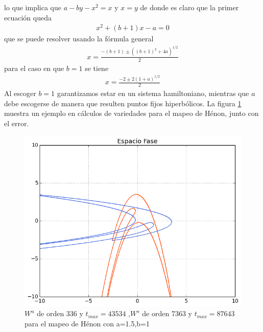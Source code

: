 lo que implica que $a-by-x^{2}=x$ y $x=y$ de donde es claro que la primer ecuación queda
\begin{eqnarray*}
x^{2}+(b+1)x-a=0
\end{eqnarray*}
que se puede resolver usando la fórmula general
\begin{eqnarray*}
x=\frac{-(b+1)\pm ((b+1)^{2}+4a)^{1/2} }{2}
\end{eqnarray*}
para el caso en que $b=1$ se tiene
\begin{eqnarray}
x=\frac{-2\pm 2(1+a)^{1/2} }{2}
\end{eqnarray}
Al escoger $b=1$ garantizamos estar en un sistema hamiltoniano, mientras que $a$ debe escogerse de manera que resulten puntos fijos hiperbólicos. La figura \ref{Henon1} muestra un ejemplo en cálculos de variedades para el mapeo de Hénon, junto con el error. 
\begin{figure}[H]
\centering
\includegraphics[scale=0.6]{henon1}
\caption{$W^{u}$ de orden 336 y $t_{max}=43534$ ,$W^{s}$ de orden 7363 y $t_{max}=87643$ para el mapeo de Hénon con a=1.5,b=1}
\label{Henon1}
\end{figure}

